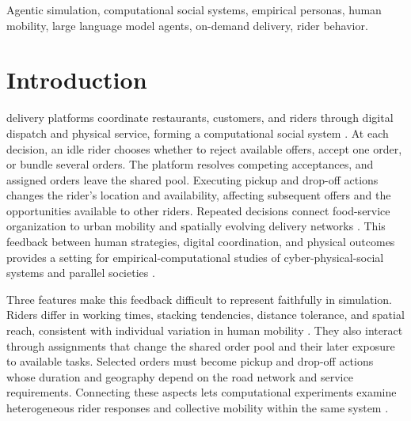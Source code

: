 \documentclass[letterpaper,journal]{IEEEtran}
\begin{document}
\begin{IEEEkeywords}
Agentic simulation, computational social systems, empirical personas, human mobility, large language model agents, on-demand delivery, rider behavior.
\end{IEEEkeywords}

\section{Introduction}
 delivery platforms coordinate restaurants, customers, and riders through digital dispatch and physical service, forming a computational social system \cite{lazerComputationalSocialScience2020,hofmanIntegratingExplanationPrediction2021}. At each decision, an idle rider chooses whether to reject available offers, accept one order, or bundle several orders. The platform resolves competing acceptances, and assigned orders leave the shared pool. Executing pickup and drop-off actions changes the rider's location and availability, affecting subsequent offers and the opportunities available to other riders. Repeated decisions connect food-service organization \cite{meemkenResearchPolicyFoodDelivery2022,zhaoOnlineOfflineFoodDelivery2021,dengLLM4GKID2026} to urban mobility and spatially evolving delivery networks \cite{zhangUncoveringCommunityStructure2026}. This feedback between human strategies, digital coordination, and physical outcomes provides a setting for empirical-computational studies of cyber-physical-social systems and parallel societies \cite{zhangCyberPhysicalSocialSystems2018,wangParallelSocieties2020}.

Three features make this feedback difficult to represent faithfully in simulation. Riders differ in working times, stacking tendencies, distance tolerance, and spatial reach, consistent with individual variation in human mobility \cite{gonzalezUnderstandingIndividualHuman2008,songLimitsPredictabilityHuman2010}. They also interact through assignments that change the shared order pool and their later exposure to available tasks. Selected orders must become pickup and drop-off actions whose duration and geography depend on the road network and service requirements. Connecting these aspects lets computational experiments examine heterogeneous rider responses and collective mobility within the same system \cite{wangSocialTransportation2019}.
\end{document}
